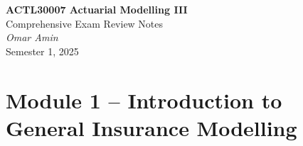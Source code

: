 \documentclass[11pt]{article}
\begin{document}
\begin{titlepage}
\begin{center}
{\LARGE \textbf{ACTL30007 Actuarial Modelling III}}\\[1.5em]
{\Large Comprehensive Exam Review Notes}\\[10em]
{\large \textit{Omar Amin}}\\[1em]
{\large Semester 1, 2025}
\end{center}
\end{titlepage}

\tableofcontents
\newpage

\section{Module 1 – Introduction to General Insurance Modelling}
\end{document}
